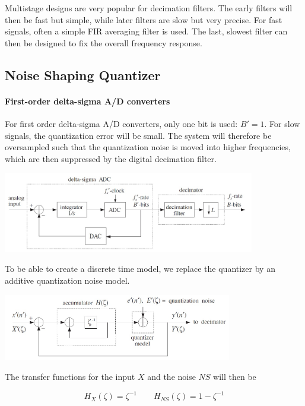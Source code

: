Multistage designs are very popular for decimation filters. The early filters will
then be fast but simple, while later filters are slow but very precise. For fast
signals, often a simple FIR averaging filter is used. The last, slowest filter
can then be designed to fix the overall frequency response.


\subsection{Noise Shaping Quantizer}

\paragraph{First-order delta-sigma A/D converters}
For first order delta-sigma A/D converters, only one bit is used: $B'=1$. For
slow signals, the quantization error will be small. The system will therefore
be oversampled such that the quantization noise is moved into higher frequencies,
which are then suppressed by the digital decimation filter.

\begin{center}
	\includegraphics[width=11cm]{images/IntDecOv_SigmaDelta.jpg}
\end{center}

To be able to create a discrete time model, we replace the quantizer by
an additive quantization noise model.

\begin{center}
	\includegraphics[width=10cm]{images/IntDecOv_SigmaDeltaModel.jpg}
\end{center}

The transfer functions for the input $X$ and the noise $NS$ will then be

\begin{equation*}
	H_X(\zeta) = \zeta^{-1} \qquad H_{NS}(\zeta) = 1 - \zeta^{-1}
\end{equation*}

